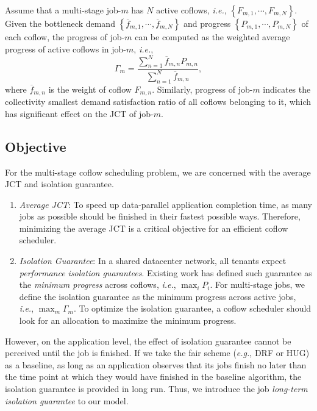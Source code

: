 \documentclass[10pt,journal,compsoc]{IEEEtran}
\begin{document}
Assume that a multi-stage job-$m$ has $N$ active coflows, \emph{i.e.}, $\left\{F_{m,1},\cdots,F_{m,N}\right\}$.
%
Given the bottleneck demand $\left\{\overline{f}_{m,1},\cdots,\overline{f}_{m,N}\right\}$ and progress $\left\{P_{m,1},\cdots,P_{m,N}\right\}$ of each coflow, the progress of job-$m$ can be computed as the weighted average progress of active coflows in job-$m$, \emph{i.e.},
\begin{equation}
	\Gamma_m = \frac{\sum_{n=1}^N \overline{f}_{m,n}P_{m,n}}{\sum_{n=1}^N \overline{f}_{m,n}},
\end{equation}
where $\overline{f}_{m,n}$ is the weight of coflow $F_{m,n}$.
%
Similarly, progress of job-$m$ indicates the collectivity smallest demand satisfaction ratio of all coflows belonging to it, which has significant effect on the JCT of job-$m$.

\subsection{Objective}
For the multi-stage coflow  scheduling problem, we are concerned with the average JCT and isolation guarantee.

\begin{enumerate}
	\item \emph{Average JCT}: To speed up data-parallel application completion time, as many jobs as possible should be finished in their fastest possible ways. Therefore, minimizing the average JCT is a critical objective for an efficient coflow scheduler.
	\item \emph{Isolation Guarantee}: In a shared datacenter network, all tenants expect \emph{performance isolation guarantees}. Existing work has defined such guarantee as the \emph{minimum progress} across coflows\cite{HUG}, \emph{i.e.}, $\max_i P_i$. For multi-stage jobs, we define the isolation guarantee as the minimum progress across active jobs, \emph{i.e.}, $\max_m \Gamma_m$. To optimize the isolation guarantee, a coflow scheduler should look for an allocation to maximize the minimum progress.
\end{enumerate}

However, on the application level, the effect of isolation guarantee cannot be perceived until the job is finished.
%
If we take the fair scheme (\emph{e.g.}, DRF\cite{DRF} or HUG\cite{HUG}) as a baseline, as long as an application observes that its jobs finish no later than the time point at which they would have finished in the baseline algorithm, the isolation guarantee is provided in long run.
%
Thus, we introduce the job \emph{long-term isolation guarantee} to our model.
\end{document}
